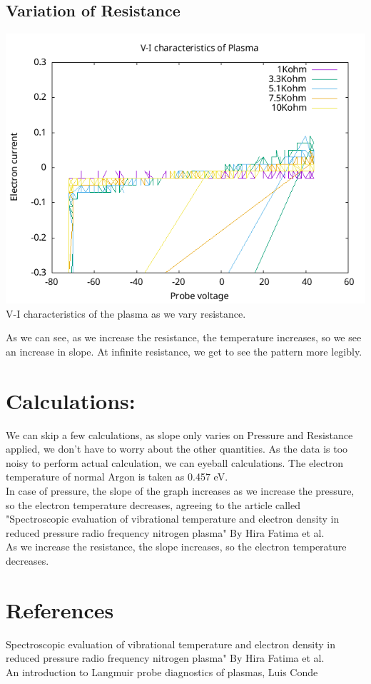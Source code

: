\documentclass[]{report}[12 pt]
\begin{document}
\subsection*{Variation of Resistance}
\begin{center}
	\includegraphics{variationresistance.png}\\
	V-I characteristics of the plasma as we vary resistance.
\end{center}
As we can see, as we increase the resistance, the temperature increases, so we see an increase in slope. At infinite resistance, we get to see the pattern more legibly.

\section*{Calculations:}
We can skip a few calculations, as slope only varies on Pressure and Resistance applied, we don't have to worry about the other quantities.
As the data is too noisy to perform actual calculation, we can eyeball calculations. The electron temperature of normal Argon is taken as 0.457 eV.\\
In case of pressure, the slope of the graph increases as we increase the pressure, so the electron temperature decreases, agreeing to the article called "Spectroscopic evaluation of vibrational temperature and electron density in reduced pressure radio frequency nitrogen plasma" By Hira Fatima et al.\\
As we increase the resistance, the slope increases, so the electron temperature decreases.

\section*{References}
Spectroscopic evaluation of vibrational temperature and electron density in reduced pressure radio frequency nitrogen plasma" By Hira Fatima et al.\\
An introduction to Langmuir probe diagnostics of plasmas, Luis Conde\\
\end{document}

